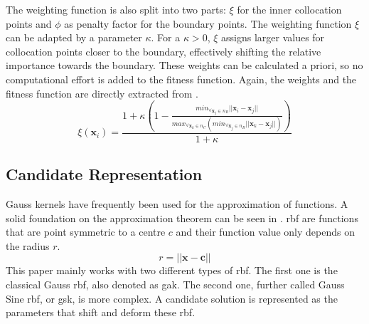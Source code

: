 \documentclass[./\jobname.tex]{subfiles}
\begin{document}
The weighting function is also split into two parts: $\xi$ for the inner collocation points and $\phi$ as penalty factor for the boundary points. The weighting function $\xi$ can be adapted by a parameter $\kappa$. For a $\kappa > 0$, $\xi$ assigns larger values for collocation points closer to the boundary, effectively shifting the relative importance towards the boundary. These weights can be calculated a priori, so no computational effort is added to the fitness function. Again, the weights and the fitness function are directly extracted from \cite{chaquet_using_2019}. 
\begin{equation}
\label{eq:nc_weight}
\xi(\mathbf{x}_i) = \frac{1 + \kappa \left(1 - \frac{min_{\forall \mathbf{x}_j\in n_B}|| \mathbf{x}_i - \mathbf{x}_j ||}{max_{\forall\mathbf{x}_k \in n_C}(min_{\forall \mathbf{x}_j \in n_B} || \mathbf{x}_k - \mathbf{x}_j ||)}\right)}{1 + \kappa}
\end{equation}


\subsection{Candidate Representation}
\label{chap:candidate_rep}
Gauss kernels have frequently been used for the approximation of functions. A solid foundation on the approximation theorem can be seen in \cite{park_universal_1991}. \gls{rbf} are functions that are point symmetric to a centre $c$ and their function value only depends on the radius $r$. 
\begin{equation}
\label{eq: radius}
r = \left|\left|\mathbf{x} - \mathbf{c} \right|\right|
\end{equation}
This paper mainly works with two different types of \gls{rbf}. The first one is the classical Gauss \gls{rbf}, also denoted as \gls{gak}. The second one, further called Gauss Sine \gls{rbf}, or \gls{gsk}, is more complex. A candidate solution is represented as the parameters that shift and deform these \gls{rbf}. 
\end{document}
